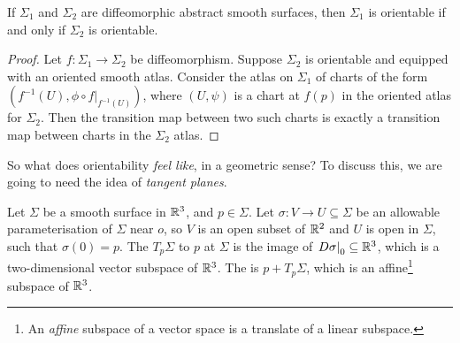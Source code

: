 \documentclass[a4paper, 10pt, twocolumn]{amsart}
\begin{document}
\begin{theorem}
    If $\Sigma_1$ and $\Sigma_2$ are diffeomorphic abstract smooth surfaces, then $\Sigma_1$ is orientable if and only if $\Sigma_2$ is orientable.
\end{theorem}
\begin{proof}
    Let $f: \Sigma_1 \rightarrow \Sigma_2$ be diffeomorphism. Suppose $\Sigma_2$ is orientable and equipped with an oriented smooth atlas. Consider the atlas on $\Sigma_1$ of charts of the form $(f^{-1}(U), \phi \circ \left.f\right|_{f^{-1}(U)})$, where $(U, \psi)$ is a chart at $f(p)$ in the oriented atlas for $\Sigma_2$. Then the transition map between two such charts is exactly a transition map between charts in the $\Sigma_2$ atlas. 
\end{proof}

So what does orientability \emph{feel like}, in a geometric sense? To discuss this, we are going to need the idea of \emph{tangent planes}.

\begin{definition}
Let $\Sigma$ be a smooth surface in $\mathbb{R}^3$, and $p \in \Sigma$. Let $\sigma: V \rightarrow U \subseteq \Sigma$ be an allowable parameterisation of $\Sigma$ near $o$, so $V$ is an open subset of $\mathbb{R}^2$ and $U$ is open in $\Sigma$, such that $\sigma(0) = p$. The  $T_p \Sigma$ to $p$ at $\Sigma$ is the image of $\left.D\sigma \right|_0 \subseteq \mathbb{R}^3$, which is a two-dimensional vector subspace of $\mathbb{R}^3$. The  is $p + T_p \Sigma$, which is an affine\footnote{An \emph{affine} subspace of a vector space is a translate of a linear subspace.} subspace of $\mathbb{R}^3$.
\end{definition}
\end{document}
